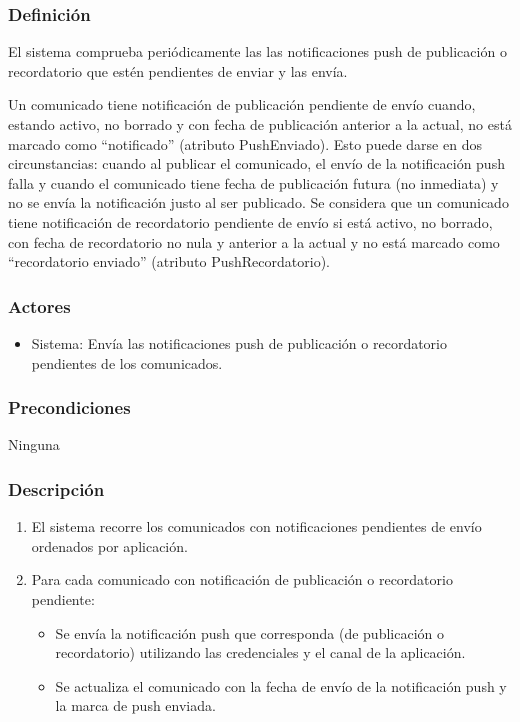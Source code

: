 \subsubsection*{Definición}
El sistema comprueba periódicamente las las notificaciones push de publicación o recordatorio que estén pendientes de enviar y las envía.

Un comunicado tiene notificación de publicación pendiente de envío cuando, estando activo, no borrado y con fecha de publicación anterior a la actual, no está marcado como ``notificado'' (atributo PushEnviado). Esto puede darse en dos circunstancias: cuando al publicar el comunicado, el envío de la notificación push falla y cuando el comunicado tiene fecha de publicación futura (no inmediata) y no se envía la notificación justo al ser publicado. Se considera que un comunicado tiene notificación de recordatorio pendiente de envío si está activo, no borrado, con fecha de recordatorio no nula y anterior a la actual y no está marcado como ``recordatorio enviado'' (atributo PushRecordatorio).

\subsubsection*{Actores}
\begin{itemize}
    \item Sistema: Envía las notificaciones push de publicación o recordatorio pendientes de los comunicados.
\end{itemize}

\subsubsection*{Precondiciones}
Ninguna

\subsubsection*{Descripción}

\begin{enumerate}
    \item El sistema recorre los comunicados con notificaciones pendientes de envío ordenados por aplicación.
    \item Para cada comunicado con notificación de publicación o recordatorio pendiente:
    \begin{itemize}
        \item Se envía la notificación push que corresponda (de publicación o recordatorio) utilizando las credenciales y el canal de la aplicación.
        \item Se actualiza el comunicado con la fecha de envío de la notificación push y la marca de push enviada.
    \end{itemize}
\end{enumerate}

